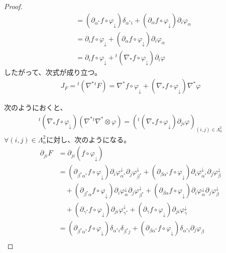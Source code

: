 \documentclass[dvipdfmx]{jsarticle}
\begin{document}
\begin{proof}
\begin{align*}
&= \left( \partial_{\alpha^{*}}f \circ \varphi_{\downarrow} \right)\delta_{\alpha^{*}i} + \left( \partial_{\alpha}f \circ \varphi_{\downarrow} \right)\partial_{i}\varphi_{\alpha}\\
&= \partial_{i}f \circ \varphi_{\downarrow} + \left( \partial_{\alpha}f \circ \varphi_{\downarrow} \right)\partial_{i}\varphi_{\alpha}\\
&= \partial_{i}f \circ \varphi_{\downarrow} +{}^t \left( \nabla_{*}f \circ \varphi_{\downarrow} \right)\partial_{i}\varphi
\end{align*}
したがって、次式が成り立つ。
\begin{align*}
J_{F} ={}^t \left( \nabla^{*}{}^t F \right) = \nabla^{*}f \circ \varphi_{\downarrow} + \left( \nabla_{*}f \circ \varphi_{\downarrow} \right)\nabla^{*}\varphi
\end{align*}\par
次のようにおくと、
\begin{align*}
{}^t \left( \nabla_{*}f \circ \varphi_{\downarrow} \right)\left( \nabla^{*}{}^t \nabla^{*} \otimes \varphi \right) = \left({}^t \left( \nabla_{*}f \circ \varphi_{\downarrow} \right)\partial_{ji}\varphi \right)_{(i,j) \in \varLambda_{n}^{2}}
\end{align*}
$\forall(i,j) \in \varLambda_{n}^{2}$に対し、次のようになる。
\begin{align*}
\partial_{ji}F &= \partial_{ji}\left( f \circ \varphi_{\downarrow} \right)\\
&= \left( \partial_{\beta^{*}\alpha^{*}}f \circ \varphi_{\downarrow} \right)\partial_{i}\varphi_{\alpha^{*}}^{\downarrow}\partial_{j}\varphi_{\beta^{*}}^{\downarrow} + \left( \partial_{\beta\alpha^{*}}f \circ \varphi_{\downarrow} \right)\partial_{i}\varphi_{\alpha^{*}}^{\downarrow}\partial_{j}\varphi_{\beta}^{\downarrow} \\
&\quad + \left( \partial_{\beta^{*}\alpha}f \circ \varphi_{\downarrow} \right)\partial_{i}\varphi_{\alpha}^{\downarrow}\partial_{j}\varphi_{\beta^{*}}^{\downarrow} + \left( \partial_{\beta\alpha}f \circ \varphi_{\downarrow} \right)\partial_{i}\varphi_{\alpha}^{\downarrow}\partial_{j}\varphi_{\beta}^{\downarrow} \\
&\quad + \left( \partial_{\gamma^{*}}f \circ \varphi_{\downarrow} \right)\partial_{ji}\varphi_{\gamma^{*}}^{\downarrow} + \left( \partial_{\gamma}f \circ \varphi_{\downarrow} \right)\partial_{ji}\varphi_{\gamma}^{\downarrow}\\
&= \left( \partial_{\beta^{*}\alpha^{*}}f \circ \varphi_{\downarrow} \right)\delta_{\alpha^{*}i}\delta_{\beta^{*}j} + \left( \partial_{\beta\alpha^{*}}f \circ \varphi_{\downarrow} \right)\delta_{\alpha^{*}i}\partial_{j}\varphi_{\beta} \\

\end{align*}
\end{proof}
\end{document}
